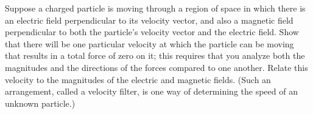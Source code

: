 Suppose a charged particle is moving through a
region of space in which there is an electric field
perpendicular to its velocity vector, and also a magnetic
field perpendicular to both the particle's velocity vector
and the electric field. Show that there will be one
particular velocity at which the particle can be moving that
results in a total force of zero on it; this requires that
you analyze both the magnitudes and the directions of the forces compared
to one another. Relate this
velocity to the magnitudes of the electric and magnetic
fields. (Such an arrangement, called a velocity filter, is
one way of determining the speed of an unknown particle.)
